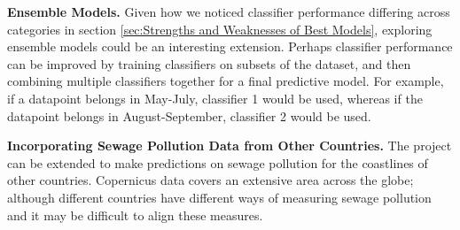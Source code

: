 \documentclass[a4paper,11pt]{report}
\begin{document}
\noindent \textbf{Ensemble Models.}
Given how we noticed classifier performance differing across categories in section \ref{sec:Strengths and Weaknesses of Best Models}, exploring ensemble models could be an interesting extension. Perhaps classifier performance can be improved by training classifiers on subsets of the dataset, and then combining multiple classifiers together for a final predictive model. For example, if a datapoint belongs in May-July, classifier 1 would be used, whereas if the datapoint belongs in August-September, classifier 2 would be used. 

\noindent \textbf{Incorporating Sewage Pollution Data from Other Countries.} The project can be extended to make predictions on sewage pollution for the coastlines of other countries. Copernicus data covers an extensive area across the globe; although different countries have different ways of measuring sewage pollution and it may be difficult to align these measures. 






\end{document}
